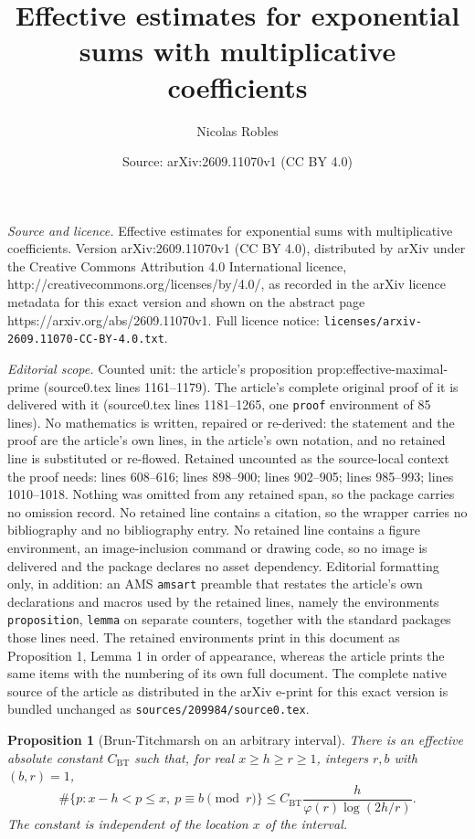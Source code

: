 \documentclass[10pt,a4paper]{amsart}
\title{Effective estimates for exponential sums with multiplicative coefficients}
\author{Nicolas Robles}
\date{Source: arXiv:2609.11070v1 (CC BY 4.0)}
\newtheorem{proposition}{Proposition}
\begin{document}
\maketitle

\noindent\emph{Source and licence.} Effective estimates for exponential sums with multiplicative coefficients. Version arXiv:2609.11070v1 (CC BY 4.0), distributed by arXiv under the Creative Commons Attribution 4.0 International licence, http://creativecommons.org/licenses/by/4.0/, as recorded in the arXiv licence metadata for this exact version and shown on the abstract page https://arxiv.org/abs/2609.11070v1. Full licence notice: \texttt{licenses/arxiv-2609.11070-CC-BY-4.0.txt}.\par\smallskip

\noindent\textit{Editorial scope.} Counted unit: the article's proposition prop:effective-maximal-prime (source0.tex lines 1161--1179). The article's complete original proof of it is delivered with it (source0.tex lines 1181--1265, one \texttt{proof} environment of 85 lines). No mathematics is written, repaired or re-derived: the statement and the proof are the article's own lines, in the article's own notation, and no retained line is substituted or re-flowed.  Retained uncounted as the source-local context the proof needs: lines 608--616; lines 898--900; lines 902--905; lines 985--993; lines 1010--1018.  Nothing was omitted from any retained span, so the package carries no omission record.  No retained line contains a citation, so the wrapper carries no bibliography and no bibliography entry.  No retained line contains a figure environment, an image-inclusion command or drawing code, so no image is delivered and the package declares no asset dependency.  Editorial formatting only, in addition: an AMS \texttt{amsart} preamble that restates the article's own declarations and macros used by the retained lines, namely the environments \texttt{proposition}, \texttt{lemma} on separate counters, together with the standard packages those lines need.  The retained environments print in this document as Proposition 1, Lemma 1 in order of appearance, whereas the article prints the same items with the numbering of its own full document.  The complete native source of the article as distributed in the arXiv e-print for this exact version is bundled unchanged as \texttt{sources/209984/source0.tex}.
\begin{proposition}[Brun-Titchmarsh on an arbitrary interval]\label{prop:BT}
There is an effective absolute constant $C_\mathrm{BT}$ such that, for
real $x\ge h\ge r\ge1$, integers $r,b$ with $(b,r)=1$,
\begin{equation}\label{eq:BT}
 \#\{p:x-h<p\le x,\ p\equiv b\pmod r\}
 \le C_\mathrm{BT}\frac{h}{\varphi(r)\log(2h/r)}.
\end{equation}
The constant is independent of the location $x$ of the interval.
\end{proposition}
\end{document}

